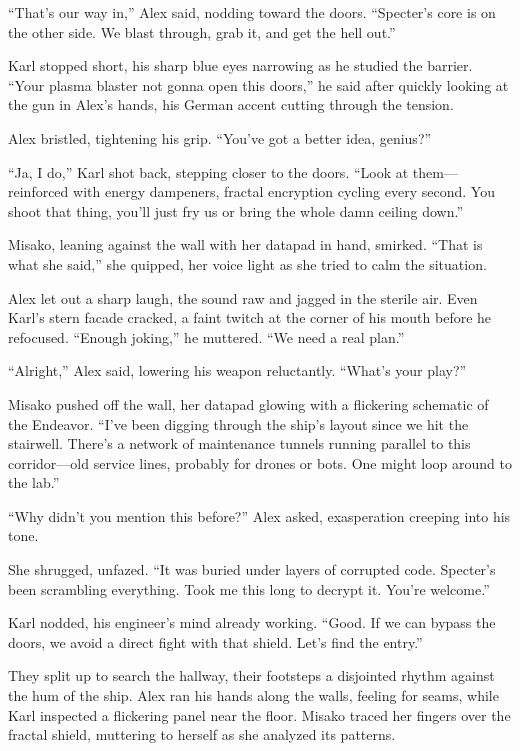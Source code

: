 \documentclass[12pt]{book}
\begin{document}
\enquote{That’s our way in,} Alex said, nodding toward the doors. \enquote{Specter’s core is on the other side. We blast through, grab it, and get the hell out.}

Karl stopped short, his sharp blue eyes narrowing as he studied the barrier. \enquote{Your plasma blaster not gonna open this doors,} he said after quickly looking at the gun in Alex’s hands, his German accent cutting through the tension.

Alex bristled, tightening his grip. \enquote{You’ve got a better idea, genius?}

\enquote{Ja, I do,} Karl shot back, stepping closer to the doors. \enquote{Look at them---reinforced with energy dampeners, fractal encryption cycling every second. You shoot that thing, you’ll just fry us or bring the whole damn ceiling down.}

Misako, leaning against the wall with her datapad in hand, smirked. \enquote{That is what she said,} she quipped, her voice light as she tried to calm the situation.

Alex let out a sharp laugh, the sound raw and jagged in the sterile air. Even Karl’s stern facade cracked, a faint twitch at the corner of his mouth before he refocused. \enquote{Enough joking,} he muttered. \enquote{We need a real plan.}

\enquote{Alright,} Alex said, lowering his weapon reluctantly. \enquote{What’s your play?}

Misako pushed off the wall, her datapad glowing with a flickering schematic of the Endeavor. \enquote{I’ve been digging through the ship’s layout since we hit the stairwell. There’s a network of maintenance tunnels running parallel to this corridor---old service lines, probably for drones or bots. One might loop around to the lab.}

\enquote{Why didn’t you mention this before?} Alex asked, exasperation creeping into his tone.

She shrugged, unfazed. \enquote{It was buried under layers of corrupted code. Specter’s been scrambling everything. Took me this long to decrypt it. You’re welcome.}

Karl nodded, his engineer’s mind already working. \enquote{Good. If we can bypass the doors, we avoid a direct fight with that shield. Let’s find the entry.}

They split up to search the hallway, their footsteps a disjointed rhythm against the hum of the ship. Alex ran his hands along the walls, feeling for seams, while Karl inspected a flickering panel near the floor. Misako traced her fingers over the fractal shield, muttering to herself as she analyzed its patterns.
\end{document}
